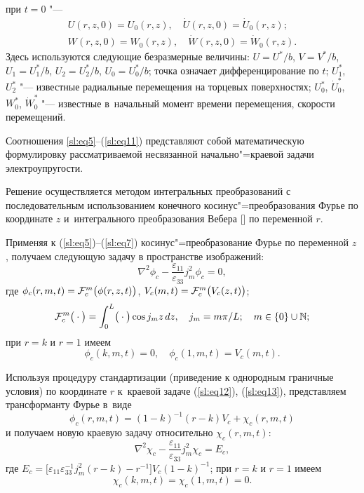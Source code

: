 при $t=0$ "---
\begin{equation}
\label{sl:eq11}
\begin{array}{c}
U(r, z, 0)=U_0 (r, z),\quad \dot {U}(r, z, 0)=\dot {U}_0 (r, z);
\\
W(r, z, 0)=W_0 (r, z),\quad \dot {W}(r, z, 0)=\dot {W}_0 (r, z).
\end{array}
\end{equation}
Здесь используются следующие безразмерные величины:
$U=U^*/b$, $V=V^*/b$, $U_1=U_1^*/b$, $U_2=U_2^*/b$, $U_0=U_0^*/b$; точка означает дифференцирование по $t$;
$U_1^*$, $U_2^*$  "--- известные радиальные перемещения на торцевых поверхностях; 
$U_0^*$, $\dot {U}_0^*$, $W_0^*$, $\dot {W}_0^*$ "--- известные в~начальный момент времени перемещения, скорости перемещений.

Соотношения \eqref{sl:eq5}--(\ref{sl:eq11}) представляют собой  математическую формулировку рассматриваемой несвязанной начально"=краевой задачи электроупругости. 

\smallskip
{}
Решение осуществляется методом интегральных преобразований с последовательным использованием конечного косинус"=преобразования Фурье по координате $z$ и~интегрального преобразования Вебера [] по переменной $r$.

Применяя к (\ref{sl:eq5})--(\ref{sl:eq7}) косинус"=преобразование Фурье по переменной $z$, получаем следующую задачу в пространстве изображений: 
\begin{equation}
\label{sl:eq12}
\nabla ^2\phi _c -\frac{\varepsilon _{11} }{\varepsilon _{33} }j_m^2 \phi _c =0, 
\end{equation}
где
$\phi _c ( r, m, t)= {\cal F}^m_c\bigl( \phi ( r, z, t) \bigr)$, $V_c (m, t) = {\cal F}^m_c \bigl(V_c(z, t)\bigr)$;
$$  
{\cal F}^m_c\bigl( {}\cdot {} \bigr) =
\int_0^L \bigl( {}\cdot {} \bigr)\cos j_m z\,  dz ,\quad j_m ={m\pi }/{L}; \quad m\in \{0\}\cup \mathbb N;
$$
при $r=k$ и $r= 1$ имеем
\begin{equation}
\label{sl:eq13}
\phi _c (k, m, t)=0, \quad \phi _c (1, m, t)=V_c (m, t).
\end{equation}

Используя процедуру стандартизации (приведение к однородным граничные условия) по координате $r$ к~краевой задаче (\ref{sl:eq12}), (\ref{sl:eq13}), представляем трансформанту Фурье в~виде 
\begin{equation}
\label{sl:eq14}
\phi _c (r, m, t)=(1-k)^{-1}(r-k)V_c +\chi _c (r, m, t)
\end{equation}
и получаем новую краевую задачу относительно $\chi _c (r, m, t)$:
\begin{equation}
\label{sl:eq15}
\nabla ^2\chi _c -\frac{\varepsilon _{11} }{\varepsilon _{33} }j_m^2 \chi _c =E_c , 
\end{equation}
где $E_c =\bigl[ \varepsilon _{11} \varepsilon _{33}^{-1} j_m^2 (r-k)-r^{-1}\bigr] V_c (1-k)^{-1}$; при $r=k$ и $r= 1$ имеем
\begin{equation}
\label{sl:eq16}
\chi _c (k, m, t)=\chi _c (1, m, t)=0.
\end{equation}

